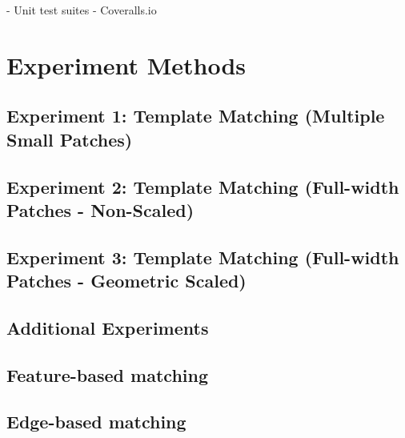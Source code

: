 - Unit test suites
- Coveralls.io

\section{Experiment Methods}

\subsection{Experiment 1: Template Matching (Multiple Small Patches)}
\label{ex1}
\subsection{Experiment 2: Template Matching (Full-width Patches - Non-Scaled)}
\subsection{Experiment 3: Template Matching (Full-width Patches - Geometric Scaled)}
\label{tm-scaled}

\subsection{Additional Experiments}

\subsection{Feature-based matching}
\subsection{Edge-based matching}




